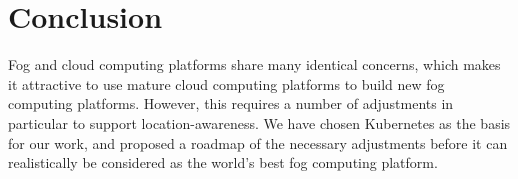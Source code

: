\documentclass[letterpaper,twocolumn,10pt]{article}
\begin{document}





\section{Conclusion}\label{sec:conclusion}

Fog and cloud computing platforms share many identical concerns, which
makes it attractive to use mature cloud computing platforms to build
new fog computing platforms. However, this requires a number of
adjustments in particular to support location-awareness. We have
chosen Kubernetes as the basis for our work, and proposed a roadmap of
the necessary adjustments before it can realistically be considered as
the world's best fog computing platform.








{\footnotesize 
}
\end{document}

